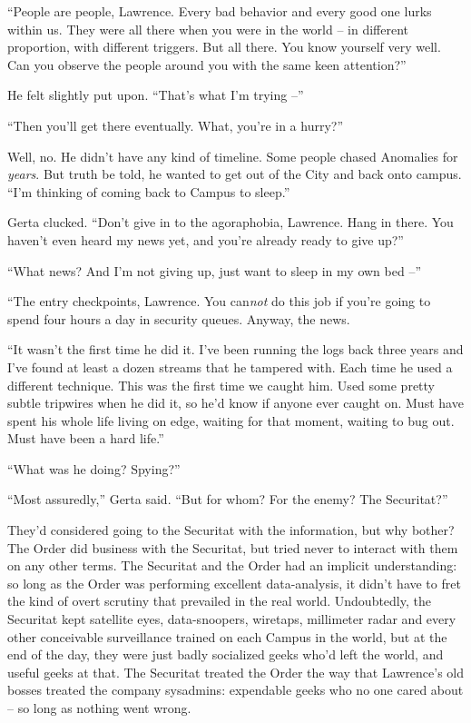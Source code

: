 “People are people, Lawrence. Every bad behavior and every good one 
lurks within us. They were all there when you were in the world -- in 
different proportion, with different triggers. But all there. You know 
yourself very well. Can you observe the people around you with the same 
keen attention?”

He felt slightly put upon. “That's what I'm trying --”

“Then you'll get there eventually. What, you're in a hurry?”

Well, no. He didn't have any kind of timeline. Some people chased 
Anomalies for \emph{years}. But truth be told, he wanted to get out of 
the City and back onto campus. “I'm thinking of coming back to Campus 
to sleep.”

Gerta clucked. “Don't give in to the agoraphobia, Lawrence. Hang in 
there. You haven't even heard my news yet, and you're already ready to 
give up?”

“What news? And I'm not giving up, just want to sleep in my own bed 
--”

“The entry checkpoints, Lawrence. You can\emph{not} do this job if 
you're going to spend four hours a day in security queues. Anyway, the 
news.

“It wasn't the first time he did it. I've been running the logs back 
three years and I've found at least a dozen streams that he tampered 
with. Each time he used a different technique. This was the first time 
we caught him. Used some pretty subtle tripwires when he did it, so 
he'd know if anyone ever caught on. Must have spent his whole life 
living on edge, waiting for that moment, waiting to bug out. Must have 
been a hard life.”

“What was he doing? Spying?”

“Most assuredly,” Gerta said. “But for whom? For the enemy? The 
Securitat?”

They'd considered going to the Securitat with the information, but why 
bother? The Order did business with the Securitat, but tried never to 
interact with them on any other terms. The Securitat and the Order had 
an implicit understanding: so long as the Order was performing 
excellent data-analysis, it didn't have to fret the kind of overt 
scrutiny that prevailed in the real world. Undoubtedly, the Securitat 
kept satellite eyes, data-snoopers, wiretaps, millimeter radar and 
every other conceivable surveillance trained on each Campus in the 
world, but at the end of the day, they were just badly socialized geeks 
who'd left the world, and useful geeks at that. The Securitat treated 
the Order the way that Lawrence's old bosses treated the company 
sysadmins: expendable geeks who no one cared about -- so long as 
nothing went wrong.


